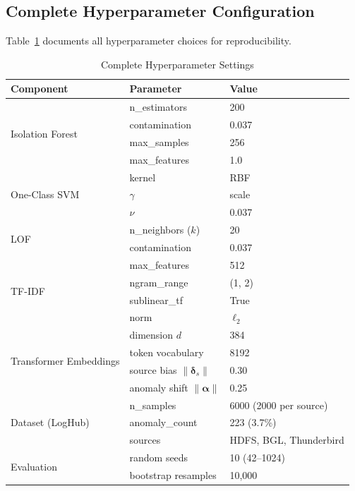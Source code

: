 \documentclass[conference]{IEEEtran}
\begin{document}
\subsection{Complete Hyperparameter Configuration}

Table~\ref{tab:hyperparams} documents all hyperparameter choices for
reproducibility.

\begin{table}[htbp]
\centering
\caption{Complete Hyperparameter Settings}
\label{tab:hyperparams}
\renewcommand{\arraystretch}{1.2}
\begin{tabular}{@{}lll@{}}
\toprule
\textbf{Component} & \textbf{Parameter} & \textbf{Value} \\
\midrule
\multirow{4}{*}{Isolation Forest}
  & n\_estimators        & 200 \\
  & contamination        & 0.037 \\
  & max\_samples         & 256 \\
  & max\_features        & 1.0 \\
\midrule
\multirow{3}{*}{One-Class SVM}
  & kernel               & RBF \\
  & $\gamma$             & scale \\
  & $\nu$                & 0.037 \\
\midrule
\multirow{2}{*}{LOF}
  & n\_neighbors ($k$)   & 20 \\
  & contamination        & 0.037 \\
\midrule
\multirow{4}{*}{TF-IDF}
  & max\_features        & 512 \\
  & ngram\_range         & (1, 2) \\
  & sublinear\_tf        & True \\
  & norm                 & $\ell_2$ \\
\midrule
\multirow{4}{*}{Transformer Embeddings}
  & dimension $d$        & 384 \\
  & token vocabulary     & 8192 \\
  & source bias $\|\boldsymbol{\delta}_s\|$ & 0.30 \\
  & anomaly shift $\|\boldsymbol{\alpha}\|$ & 0.25 \\
\midrule
\multirow{3}{*}{Dataset (LogHub)}
  & n\_samples           & 6000 (2000 per source) \\
  & anomaly\_count       & 223 (3.7\%) \\
  & sources              & HDFS, BGL, Thunderbird \\
\midrule
\multirow{2}{*}{Evaluation}
  & random seeds         & 10 (42--1024) \\
  & bootstrap resamples  & 10{,}000 \\
\bottomrule
\end{tabular}
\end{table}
\end{document}
